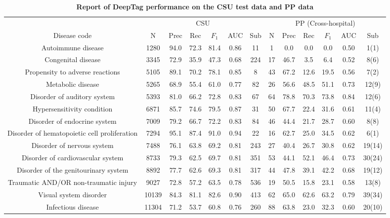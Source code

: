 \begin{table*}[h]
\centering
\footnotesize
\begin{adjustwidth}{-0.5in}{0in}
\caption{\textbf{Report of DeepTag performance on the CSU test data and PP data}}
\begin{tabular}{c | c c c c c c | c c c c c c }
\toprule
 & \multicolumn{6}{c|}{CSU} & \multicolumn{6}{c}{PP (Cross-hospital)}  \\
Disease code & N & Prec & Rec & $F_1$ & AUC & Sub & N & Prec & Rec & $F_1$ & AUC & Sub \\
\midrule
Autoimmune disease & 1280 & 94.0 & 72.3 & 81.4 & 0.86 & 11 & 1 & 0.0 & 0.0 & 0.0 & 0.50 & 1(1) \\
Congenital disease & 3345 & 72.9 & 35.9 & 47.3 & 0.68 & 224 & 17 & 46.7 & 3.5 & 6.4 & 0.52 & 8(6) \\
Propensity to adverse reactions & 5105 & 89.1 & 70.2 & 78.1 & 0.85 & 8 & 43 & 67.2 & 12.6 & 19.5 & 0.56 & 7(2) \\
Metabolic disease & 5265 & 68.9 & 55.4 & 61.0 & 0.77 & 82 & 26 & 56.6 & 48.5 & 51.1 & 0.73 & 12(9) \\
Disorder of auditory system & 5393 & 81.0 & 66.2 & 72.8 & 0.83 & 67 & 64 & 78.8 & 70.3 & 73.8 & 0.84 & 12(6) \\
Hypersensitivity condition & 6871 & 85.7 & 74.6 & 79.5 & 0.87 & 31 & 50 & 67.7 & 22.4 & 31.6 & 0.61 & 11(4) \\
Disorder of endocrine system & 7009 & 79.2 & 66.7 & 72.2 & 0.83 & 84 & 46 & 44.4 & 21.7 & 28.7 & 0.60 & 8(8) \\
Disorder of hematopoietic cell proliferation & 7294 & 95.1 & 87.4 & 91.0 & 0.94 & 22 & 16 & 62.7 & 25.0 & 34.5 & 0.62 & 6(1) \\
Disorder of nervous system & 7488 & 76.1 & 63.8 & 69.2 & 0.81 & 243 & 27 & 40.4 & 26.7 & 30.8 & 0.62 & 19(14) \\
Disorder of cardiovascular system & 8733 & 79.3 & 62.5 & 69.7 & 0.81 & 351 & 53 & 44.1 & 52.1 & 46.4 & 0.73 & 30(24) \\
Disorder of the genitourinary system & 8892 & 77.7 & 62.6 & 69.3 & 0.81 & 317 & 44 & 47.8 & 39.1 & 42.2 & 0.68 & 19(12) \\
Traumatic AND/OR non-traumatic injury & 9027 & 72.8 & 57.2 & 63.5 & 0.78 & 536 & 19 & 50.5 & 15.8 & 23.1 & 0.58 & 13(8) \\
Visual system disorder & 10139 & 84.3 & 81.1 & 82.6 & 0.90 & 413 & 62 & 65.0 & 62.6 & 63.2 & 0.79 & 39(34) \\
Infectious disease & 11304 & 71.2 & 53.7 & 60.8 & 0.76 & 260 & 88 & 63.8 & 23.0 & 32.3 & 0.60 & 20(10) \\

\end{tabular}
\end{adjustwidth}
\end{table*}

